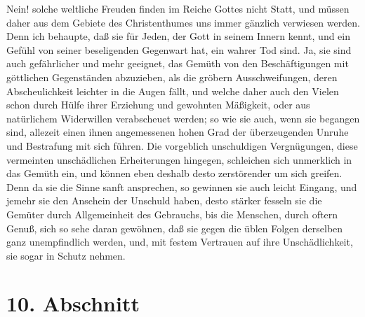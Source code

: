 Nein! solche weltliche Freuden finden im Reiche Gottes
nicht Statt, und müssen daher aus dem Gebiete des Christenthumes uns immer
gänzlich verwiesen werden. Denn ich behaupte, daß sie für Jeden, der Gott in
seinem Innern kennt, und ein Gefühl von seiner beseligenden Gegenwart hat, ein
wahrer Tod sind. Ja, sie sind auch gefährlicher und mehr geeignet, das Gemüth
von den Beschäftigungen mit göttlichen Gegenständen abzuzieben, als die gröbern
Ausschweifungen, deren Abscheulichkeit leichter in die Augen fällt, und welche
daher auch den Vielen schon durch Hülfe ihrer Erziehung und gewohnten Mäßigkeit,
oder aus natürlichem Widerwillen verabscheuet werden; so wie sie auch, wenn sie
begangen sind, allezeit einen ihnen angemessenen hohen Grad der überzeugenden
Unruhe und Bestrafung mit sich führen. Die vorgeblich unschuldigen Vergnügungen,
diese vermeinten unschädlichen Erheiterungen hingegen, schleichen sich
unmerklich in das Gemüth ein, und können eben deshalb desto zerstörender um sich
greifen. Denn da sie die Sinne sanft ansprechen, so gewinnen sie auch leicht
Eingang, und jemehr sie den Anschein der Unschuld haben, desto stärker fesseln
sie die Gemüter durch Allgemeinheit des Gebrauchs, bis die Menschen, durch
oftern Genuß, sich so sehe daran gewöhnen, daß sie gegen die üblen Folgen
derselben ganz unempfindlich werden, und, mit festem Vertrauen auf ihre
Unschädlichkeit, sie sogar in Schutz nehmen.

\section{10. Abschnitt} \label{kap15_ab10}

